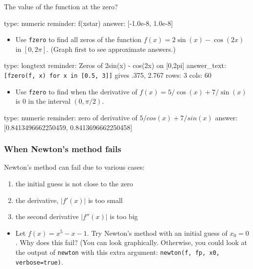 \documentclass[12pt]{article}
\begin{document}
The value of the function at the zero?

\begin{answer}
    type: numeric
    reminder: f(xstar)
    answer: [-1.0e-8, 1.0e-8]

\end{answer}

\begin{itemize}
\itemsep1pt\parskip0pt
\item
  Use \texttt{fzero} to find all zeros of the function
  $f(x) = 2\sin(x) -   \cos(2x)$ in $[0, 2\pi]$. (Graph first to see
  approximate answers.)
\end{itemize}

\begin{answer}
type: longtext
reminder: Zeros of 2sin(x) - cos(2x) on [0,2pi]
answer_text: \verb+[fzero(f, x) for x in [0.5, 3]]+ gives .375, 2.767 
rows: 3
cols: 60
\end{answer}

\begin{itemize}
\itemsep1pt\parskip0pt
\item
  Use \texttt{fzero} to find when the derivative of
  $f(x) = 5/\cos(x) +   7/\sin(x)$ is $0$ in the interval $(0, \pi/2)$.
\end{itemize}

\begin{answer}
    type: numeric
    reminder: zero of derivative of \( 5/cos(x) + 7/sin(x) \)
    answer: [0.8413496662250459, 0.8413696662250458]

\end{answer}

\subsubsection{When Newton's method fails}

Newton's method can fail due to various cases:

\begin{enumerate}
\def\labelenumi{\arabic{enumi})}
\item
  the initial guess is not close to the zero
\item
  the derivative, $\vert f'(x)\vert $ is too small
\item
  the second derivative $\vert f''(x)\vert $ is too big
\end{enumerate}

\begin{itemize}
\itemsep1pt\parskip0pt
\item
  Let $f(x) = x^5 - x - 1$. Try Newton's method with an initial guess of
  $x_0=0$. Why does this fail? (You can look graphically. Otherwise, you
  could look at the output of \texttt{newton} with this extra argument:
  \texttt{newton(f, fp, x0, verbose=true)}.
\end{itemize}
\end{document}
